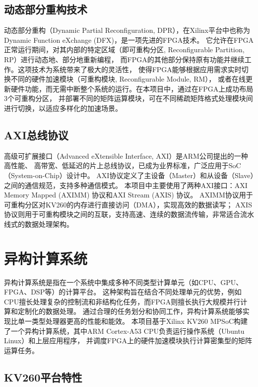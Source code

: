 \subsection{动态部分重构技术}

动态部分重构（Dynamic Partial Reconfiguration, DPR），在Xilinx平台中也称为Dynamic Function eXchange (DFX)，是一项先进的FPGA技术。
它允许在FPGA正常运行期间，对其内部的特定区域（即可重构分区, Reconfigurable Partition, RP）进行动态地、部分地重新编程，
而FPGA的其他部分保持原有功能并继续工作。这项技术为系统带来了极大的灵活性，
使得FPGA能够根据应用需求实时切换不同的硬件加速模块（可重构模块, Reconfigurable Module, RM），
或者在线更新硬件功能，而无需中断整个系统的运行。在本项目中，通过在FPGA上成功布局3个可重构分区，
并部署不同的矩阵运算模块，可在不同稀疏矩阵格式处理模块间进行切换，以适应多样化的加速场景。

\subsection{AXI总线协议}

高级可扩展接口（Advanced eXtensible Interface, AXI）是ARM公司提出的一种高性能、
高带宽、低延迟的片上总线协议，已成为业界标准，广泛应用于SoC（System-on-Chip）设计中。
AXI协议定义了主设备（Master）和从设备（Slave）之间的通信规范，支持多种通信模式。
本项目中主要使用了两种AXI接口：AXI Memory Mapped (AXIMM) 协议和AXI Stream (AXIS) 协议。
AXIMM协议用于可重构分区对KV260的内存进行直接访问（DMA），实现高效的数据读写；
AXIS协议则用于可重构模块之间的互联，支持高速、连续的数据流传输，非常适合流水线式的数据处理架构。

\section{异构计算系统}

异构计算系统是指在一个系统中集成多种不同类型计算单元（如CPU、GPU、FPGA、DSP等）的计算平台。
这种架构旨在结合不同处理单元的优势，例如CPU擅长处理复杂的控制流和非结构化任务，而FPGA则擅长执行大规模并行计算和定制化的数据处理。
通过合理的任务划分和协同工作，异构计算系统能够实现比单一类型处理器更高的性能和能效。
本项目基于Xilinx KV260 MPSoC构建了一个异构计算系统，其中ARM Cortex-A53 CPU负责运行操作系统（Ubuntu Linux）和上层应用程序，
并调度FPGA上的硬件加速模块执行计算密集型的矩阵运算任务。

\subsection{KV260平台特性}

